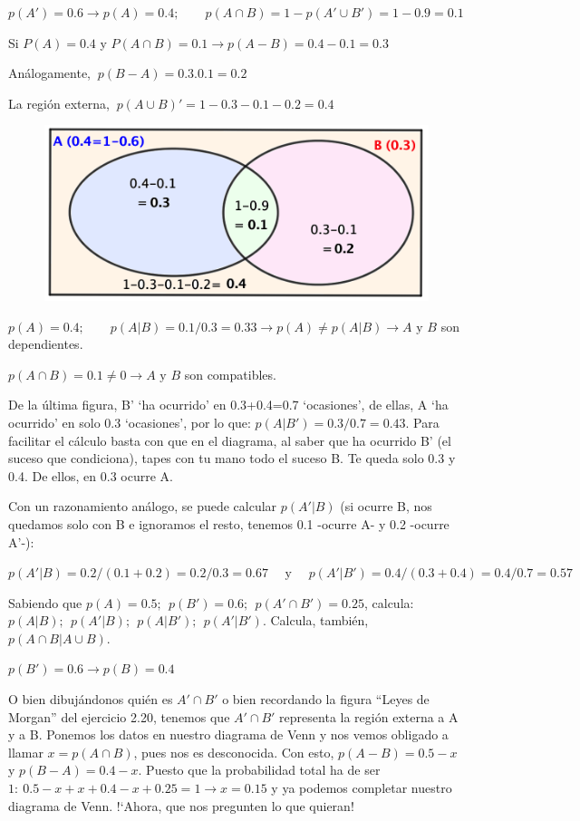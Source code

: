 $p(A')=0.6\to p(A)=0.4;\qquad p(A\cap B)=1-p(A'\cup B')=1-0.9=0.1$

Si $P(A)=0.4$ y $P(A\cap B)=0.1 \to  p(A-B)= 0.4-0.1=0.3$

Análogamente, $\ p(B-A)=0.3.0.1=0.2$

La región externa, $\ p(A\cup B)'=1-0.3-0.1-0.2=0.4$

	\begin{figure}[H]
		\centering
		\includegraphics[width=.6\textwidth]{imagenes/imagenes02/T02IM39.png}
	\end{figure}
$p(A)=0.4;\qquad     p(A|B)=0.1/0.3=0.33 \to p(A)\neq p(A|B) \to A \text{ y } B$ son dependientes.

$p(A\cap B)=0.1\neq 0 \to A \text{ y } B$ son compatibles.

De la última figura, B' `ha ocurrido' en 0.3+0.4=0.7 `ocasiones', de ellas, A `ha ocurrido' en solo 0.3 `ocasiones', por lo que: $p(A|B')=0.3/0.7=0.43$. Para facilitar el cálculo basta con que en el diagrama, al saber que ha ocurrido B' (el suceso que condiciona), tapes con tu mano todo el suceso B. Te queda solo 0.3 y 0.4. De ellos, en 0.3 ocurre A.

Con un razonamiento análogo, se puede calcular $p(A'|B)$ (si ocurre B, nos quedamos solo con B e ignoramos el resto, tenemos 0.1 -ocurre A- y 0.2 -ocurre A'-):

$p(A'|B)=0.2/(0.1+0.2)=0.2/0.3=0.67
\quad \text{ y } \quad  
p(A'|B')=0.4/(0.3+0.4)=0.4/0.7=0.57$

\vspace{5mm}
\begin{ejemplo}
\begin{ejer}
Sabiendo que $p(A)=0.5;\ \ p(B')=0.6;\ \ p(A'\cap B')=0.25$, calcula:
$p(A|B); \ \  p(A'|B); \ \ p(A|B'); \ \  p(A'|B')$. Calcula, también, $p(A\cap B|A\cup B)$.
\end{ejer}
\end{ejemplo}
$p(B')=0.6 \to p(B)=0.4$

O bien dibujándonos quién es $A'\cap B'$ o bien recordando la figura ``Leyes de Morgan'' del ejercicio 2.20, tenemos que $A'\cap B'$ representa la región externa a A y a B. Ponemos los datos en nuestro diagrama de Venn y nos vemos obligado a llamar $x=p(A\cap B)$, pues nos es desconocida. Con esto, $p(A-B)=0.5-x$ y $p(B-A)=0.4-x$. Puesto que la probabilidad total ha de ser $1:\ 0.5-x+x+0.4-x+0.25=1 \to x=0.15$ y ya podemos completar nuestro diagrama de Venn. !`Ahora, que nos pregunten lo que quieran!

